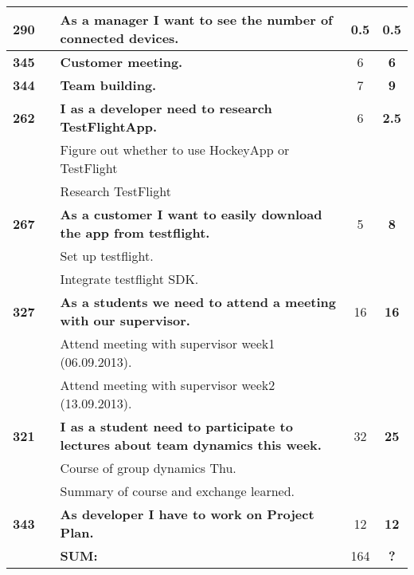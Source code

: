 \begin{longtable}{ccXcc}
\textbf{290} 	& {M3}
	& {\bf As a manager I want to see the number of connected devices. } 	& 		0.5	& \textbf{0.5} \\

		
\midrule
				

\textbf{345} 	&& {\bf Customer meeting.} 	& 		6	& \textbf{6} \\

\textbf{344} 	&& {\bf Team building.} 	& 		7	& \textbf{9} \\


\textbf{262} 	&& {\bf I as a developer need to research TestFlightApp. } 	& 		6	& \textbf{2.5} \\
				&& Figure out whether to use HockeyApp or TestFlight&  &  \\
				&& Research TestFlight	&  &  \\
				
			
\textbf{267} 	&& {\bf As a customer I want to easily download the app from testflight. } 	& 		5	& \textbf{8} \\
				&& Set up testflight.	&  &  \\
				&& Integrate testflight SDK. &  &  \\

		
\textbf{327} 	&& {\bf As a students we need to attend a meeting with our supervisor. } 	& 		16	& \textbf{16} \\
				&& Attend meeting with supervisor week1 (06.09.2013).	&  &  \\
				&& Attend meeting with supervisor week2 (13.09.2013).	&  &  \\

\midrule
\textbf{321} 	&& {\bf I as a student need to participate to lectures about team dynamics this week. } 	& 		32	& \textbf{25} \\
				&& Course of group dynamics Thu.	&  &  \\
				&& Summary of course and exchange learned.	&  &  \\
				
\textbf{343} 	&& {\bf As developer I have to work on Project Plan.} 	& 		12	& \textbf{12} \\
				
\hline
				&& \textbf{SUM:}		&		164	& \textbf{?}
 \\																			
\bottomrule[1mm]
\end{longtable}
